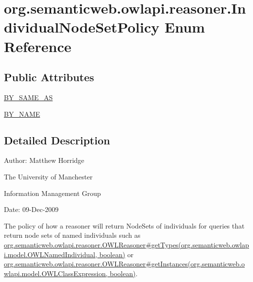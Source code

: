 \hypertarget{enumorg_1_1semanticweb_1_1owlapi_1_1reasoner_1_1_individual_node_set_policy}{\section{org.\-semanticweb.\-owlapi.\-reasoner.\-Individual\-Node\-Set\-Policy Enum Reference}
\label{enumorg_1_1semanticweb_1_1owlapi_1_1reasoner_1_1_individual_node_set_policy}
}
\subsection*{Public Attributes}
\begin{DoxyCompactItemize}
\item 
\hyperlink{enumorg_1_1semanticweb_1_1owlapi_1_1reasoner_1_1_individual_node_set_policy_af84f77cd66fa440ee5a8597326b098e3}{B\-Y\-\_\-\-S\-A\-M\-E\-\_\-\-A\-S}
\item 
\hyperlink{enumorg_1_1semanticweb_1_1owlapi_1_1reasoner_1_1_individual_node_set_policy_a1fbf26b542eea4dd37010729986bce6c}{B\-Y\-\_\-\-N\-A\-M\-E}
\end{DoxyCompactItemize}


\subsection{Detailed Description}
Author\-: Matthew Horridge\par
 The University of Manchester\par
 Information Management Group\par
 Date\-: 09-\/\-Dec-\/2009 

The policy of how a reasoner will return {\ttfamily Node\-Set}s of individuals for queries that return node sets of named individuals such as \hyperlink{interfaceorg_1_1semanticweb_1_1owlapi_1_1reasoner_1_1_o_w_l_reasoner_a0967a7207dc4d927e4542110381d94c4}{org.\-semanticweb.\-owlapi.\-reasoner.\-O\-W\-L\-Reasoner\#get\-Types(org.\-semanticweb.\-owlapi.\-model.\-O\-W\-L\-Named\-Individual, boolean)} or \hyperlink{interfaceorg_1_1semanticweb_1_1owlapi_1_1reasoner_1_1_o_w_l_reasoner_a8bbe84b91ee32baa0ad239d8eae8841e}{org.\-semanticweb.\-owlapi.\-reasoner.\-O\-W\-L\-Reasoner\#get\-Instances(org.\-semanticweb.\-owlapi.\-model.\-O\-W\-L\-Class\-Expression, boolean)}. 

